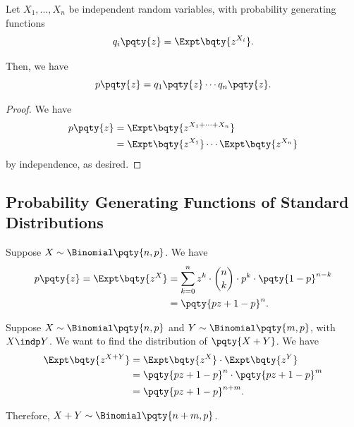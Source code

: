 \begin{proposition}
    \label{prop:pgf-sum}%
    Let \(X_1, \ldots, X_n\) be independent random variables, with probability generating functions
    \[
        q_i\pqty{z} = \Expt\bqty{z^{X_i}}.
    \]

    Then, we have
    \[
        p\pqty{z} = q_1\pqty{z} \cdots q_n\pqty{z}.
    \]
\end{proposition}

\begin{proof}
    We have
    \begin{align*}
        p\pqty{z} &= \Expt\bqty{z^{X_1 + \cdots + X_n}} \\
        &= \Expt\bqty{z^{X_1}} \cdots \Expt\bqty{z^{X_n}}
    \end{align*}
    by independence, as desired.
\end{proof}

\subsection{Probability Generating Functions of Standard Distributions}

\begin{example}
    \label{ex:pgf-binomial}%
    Suppose \(X \sim \Binomial\pqty{n, p}\). We have
    \begin{align*}
        p\pqty{z} = \Expt\bqty{z^X} &= \sum_{k = 0}^{n} z^k \cdot \binom{n}{k} \cdot p^k \cdot \pqty{1 - p}^{n - k} \\
        &= \pqty{pz + 1 - p}^n.
    \end{align*}
\end{example}

\begin{example}
    \label{ex:sum-binomial}%
    Suppose \(X \sim \Binomial\pqty{n, p}\) and \(Y \sim \Binomial\pqty{m, p}\), with \(X \indp Y\). We want to find the distribution of \(\pqty{X + Y}\). We have
    \begin{align*}
        \Expt\bqty{z^{X + Y}} &= \Expt\bqty{z^X} \cdot \Expt\bqty{z^Y} \\
        &= \pqty{pz + 1 - p}^{n} \cdot \pqty{pz + 1 - p}^{m} \\
        &= \pqty{pz + 1 - p}^{n + m}.
    \end{align*}

    Therefore, \(X + Y \sim \Binomial\pqty{n + m, p}\).
\end{example}

